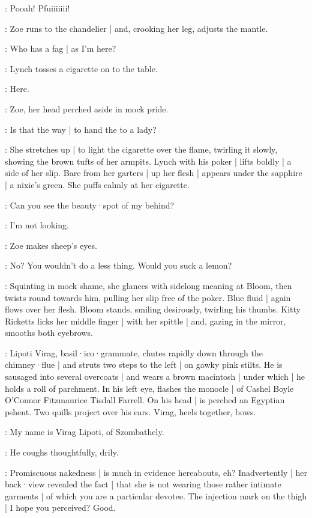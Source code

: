 \Gasjet:
Pooah!
Pfuiiiiiii!

:
Zoe runs to the chandelier |
and,
crooking her leg,
adjusts the mantle.

\Zoe:
Who has a fag |
as I'm here?

:
Lynch tosses a cigarette on to the table.

\Lynch:
Here.

:
Zoe,
her head perched aside in mock pride.

\Zoe:
Is that the way |
to hand the  to a lady?

:
She stretches up |
to light the cigarette over the flame,
twirling it slowly,
showing the brown tufts of her armpits.
Lynch with his poker |
lifts boldly |
a side of her slip.
Bare from her garters |
up her flesh |
appears under the sapphire |
a nixie's green.
She puffs calmly at her cigarette.

\Zoe:
Can you see the beauty·spot of my behind?

\Lynch:
I'm not looking.

:
Zoe makes sheep's eyes.

\Zoe:
No?
You wouldn't do a less thing.
Would you suck a lemon?

:
Squinting in mock shame,
she glances with sidelong meaning at Bloom,
then twists round towards him,
pulling her slip free of the poker.
Blue fluid |
again flows over her flesh.
Bloom stands,
smiling desirously,
twirling his thumbs.
Kitty Ricketts licks her middle finger |
with her spittle |
and,
gazing in the mirror,
smooths both eyebrows.

:
Lipoti Virag,
basil·ico·grammate,
chutes rapidly down through the chimney·flue |
and struts two steps to the left |
on gawky pink stilts.
He is sausaged into several overcoats |
and wears a brown macintosh |
under which |
he holds a roll of parchment.
In his left eye,
flashes the monocle |
of Cashel Boyle O'Connor Fitzmaurice Tisdall Farrell.
On his head |
is perched an Egyptian pshent.
Two quills project over his ears.%
Virag,
heels together,
bows.

\Virag:
My name is Virag Lipoti,
of Szombathely.

:
He coughs thoughtfully,
drily.

\Virag:
Promiscuous nakedness |
is much in evidence hereabouts,
eh?
Inadvertently |
her back·view revealed the fact |
that she is not wearing those rather intimate garments |
of which you are a particular devotee.
The injection mark on the thigh |
I hope you perceived?
Good.

